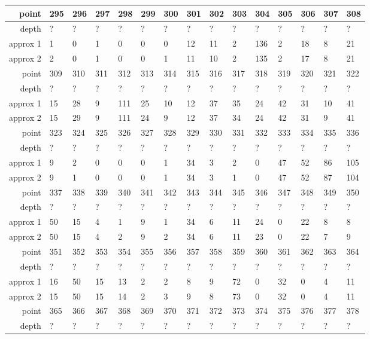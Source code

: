 \begin{center}
\begin{supertabular}{|r|l l l l l l l l l l l l l l|}
\hline
point & 295 & 296 & 297 & 298 & 299 & 300 & 301 & 302 & 303 & 304 & 305 & 306 & 307 & 308 \\
\hline
depth & ? & ? & ? & ? & ? & ? & ? & ? & ? & ? & ? & ? & ? & ? \\
approx 1 & 1 & 0 & 1 & 0 & 0 & 0 & 12 & 11 & 2 & 136 & 2 & 18 & 8 & 21 \\
approx 2 & 2 & 0 & 1 & 0 & 0 & 1 & 11 & 10 & 2 & 135 & 2 & 17 & 8 & 21 \\
\hline
point & 309 & 310 & 311 & 312 & 313 & 314 & 315 & 316 & 317 & 318 & 319 & 320 & 321 & 322 \\
\hline
depth & ? & ? & ? & ? & ? & ? & ? & ? & ? & ? & ? & ? & ? & ? \\
approx 1 & 15 & 28 & 9 & 111 & 25 & 10 & 12 & 37 & 35 & 24 & 42 & 31 & 10 & 41 \\
approx 2 & 15 & 29 & 9 & 111 & 24 & 9 & 12 & 37 & 34 & 24 & 42 & 31 & 9 & 41 \\
\hline
point & 323 & 324 & 325 & 326 & 327 & 328 & 329 & 330 & 331 & 332 & 333 & 334 & 335 & 336 \\
\hline
depth & ? & ? & ? & ? & ? & ? & ? & ? & ? & ? & ? & ? & ? & ? \\
approx 1 & 9 & 2 & 0 & 0 & 0 & 1 & 34 & 3 & 2 & 0 & 47 & 52 & 86 & 105 \\
approx 2 & 9 & 1 & 0 & 0 & 0 & 1 & 34 & 3 & 1 & 0 & 47 & 52 & 87 & 104 \\
\hline
point & 337 & 338 & 339 & 340 & 341 & 342 & 343 & 344 & 345 & 346 & 347 & 348 & 349 & 350 \\
\hline
depth & ? & ? & ? & ? & ? & ? & ? & ? & ? & ? & ? & ? & ? & ? \\
approx 1 & 50 & 15 & 4 & 1 & 9 & 1 & 34 & 6 & 11 & 24 & 0 & 22 & 8 & 8 \\
approx 2 & 50 & 15 & 4 & 2 & 9 & 2 & 34 & 6 & 11 & 23 & 0 & 22 & 7 & 9 \\
\hline
point & 351 & 352 & 353 & 354 & 355 & 356 & 357 & 358 & 359 & 360 & 361 & 362 & 363 & 364 \\
\hline
depth & ? & ? & ? & ? & ? & ? & ? & ? & ? & ? & ? & ? & ? & ? \\
approx 1 & 16 & 50 & 15 & 13 & 2 & 2 & 8 & 9 & 72 & 0 & 32 & 0 & 4 & 11 \\
approx 2 & 15 & 50 & 15 & 14 & 2 & 3 & 9 & 8 & 73 & 0 & 32 & 0 & 4 & 11 \\
\hline
point & 365 & 366 & 367 & 368 & 369 & 370 & 371 & 372 & 373 & 374 & 375 & 376 & 377 & 378 \\
\hline
depth & ? & ? & ? & ? & ? & ? & ? & ? & ? & ? & ? & ? & ? & ? \\

\end{supertabular}
\end{center}
